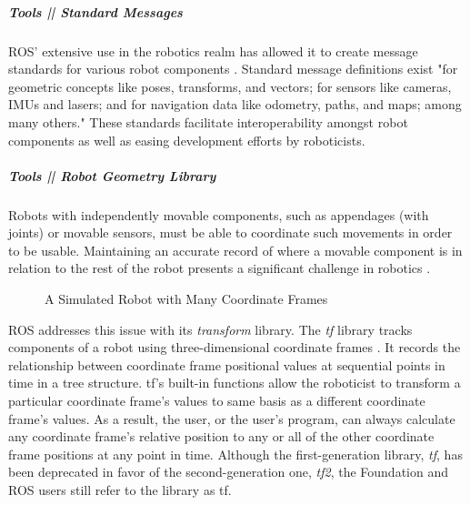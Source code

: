 \documentclass[9pt,twocolumn,twoside]{../../styles/osajnl}
\begin{document}
\subparagraph{Tools || Standard Messages}
ROS' extensive use in the robotics realm has allowed it to create message standards for various robot components \cite{www-ros-core-components}.  Standard message definitions exist "for geometric concepts like poses, transforms, and vectors; for sensors like cameras, IMUs and lasers; and for navigation data like odometry, paths, and maps; among many others."  These standards facilitate interoperability amongst robot components as well as easing development efforts by roboticists. 

\subparagraph{Tools || Robot Geometry Library}
Robots with independently movable components, such as appendages (with joints) or movable sensors, must be able to coordinate such movements in order to be usable.  Maintaining an accurate record of where a movable component is in relation to the rest of the robot presents a significant challenge in robotics \cite{www-ros-core-components}. 

\begin{figure}[htbp]
\centering
{}
\caption{A Simulated Robot with Many Coordinate Frames \cite{www-ros-robot-geometry}}
\label{fig:robotgeometry}
\end{figure}

ROS addresses this issue with its \textit{transform} library.  The \textit{tf} library tracks components of a robot using three-dimensional coordinate frames \cite{www-ros-robot-geometry}.  It records the relationship between coordinate frame positional values at sequential points in time in a tree structure.  tf's built-in functions allow the roboticist to transform a particular coordinate frame's values to same basis as a different coordinate frame's values.  As a result, the user, or the user's program, can always calculate any coordinate frame's relative position to any or all of the other coordinate frame positions at any point in time.  Although the first-generation library, \textit{tf}, has been deprecated in favor of the second-generation one, \textit{tf2}, the Foundation and ROS users still refer to the library as tf.
\end{document}
